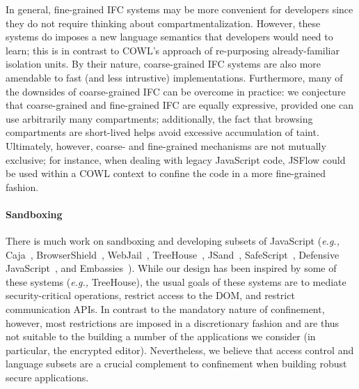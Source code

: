 In general, fine-grained IFC systems may be more convenient for
developers since they do not require thinking about
compartmentalization.
%
However, these systems do imposes a new language semantics that
developers would need to learn; this is in contrast to COWL's approach
of re-purposing already-familiar isolation units.
%
By their nature, coarse-grained IFC systems are also more
amendable to fast (and less intrustive) implementations.
%
Furthermore, many of the downsides of coarse-grained IFC can be overcome
in practice: we conjecture that coarse-grained and fine-grained IFC are
equally expressive, provided one can use arbitrarily many compartments;
additionally, the fact that browsing compartments are short-lived helps
avoid excessive accumulation of taint. 
%
Ultimately, however, coarse- and
fine-grained mechanisms are not mutually exclusive; for instance, when
dealing with legacy JavaScript code, JSFlow could be used within
a COWL context to confine the code in a more fine-grained fashion.

\paragraph{Sandboxing}
There is much work on sandboxing and developing subsets of JavaScript (\emph{e.g.,}
Caja~\cite{GoogleCaja}, BrowserShield~\cite{Reis:2007},
WebJail~\cite{VanAcker:2011}, TreeHouse~\cite{Ingram:2012},
JSand~\cite{Agten:2012:JCC}, SafeScript~\cite{SafeScript}, Defensive
JavaScript~\cite{djs}, and Embassies~\cite{Howell:2013}). 
%
While our design has been inspired by some of these systems (\emph{e.g.,}
TreeHouse), the usual goals of these systems are to mediate
security-critical operations, restrict access to the DOM, and restrict
communication APIs\@.
%
In contrast to the mandatory nature of confinement, however, most restrictions
are imposed in a discretionary fashion and are thus not suitable to the
building a number of the applications we consider (in particular, the encrypted
editor).
%
Nevertheless, we believe that access control and language subsets are a crucial
complement to confinement when building robust secure applications.

